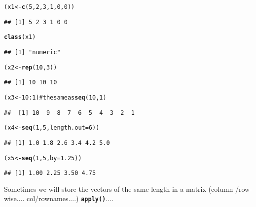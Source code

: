 \documentclass[11pt]{article}\usepackage{graphicx, color}
\makeatletter
\newcommand{\hlfunctioncall}[1]{\textcolor[rgb]{0.501960784313725,0,0.329411764705882}{\textbf{#1}}}%
\newcommand{\hlcomment}[1]{\textcolor[rgb]{0.180392156862745,0.6,0.341176470588235}{#1}}%
\newenvironment{kframe}{%
 \def\at@end@of@kframe{}%
 \ifinner\ifhmode%
  \def\at@end@of@kframe{\end{minipage}}%
  \begin{minipage}{\columnwidth}%
 \fi\fi%
 \def\FrameCommand##1{\hskip\@totalleftmargin \hskip-\fboxsep
 \colorbox{shadecolor}{##1}\hskip-\fboxsep
     \hskip-\linewidth \hskip-\@totalleftmargin \hskip\columnwidth}%
 \MakeFramed {\advance\hsize-\width
   \@totalleftmargin\z@ \linewidth\hsize
   \@setminipage}}%
 {\par\unskip\endMakeFramed%
 \at@end@of@kframe}
\newenvironment{knitrout}{}{} %
\newcommand{\Rfunc}[1]{\texttt{\hlfunctioncall{#1}}}
\theoremstyle{remark}
\theoremstyle{definition}
\makeatother
\begin{document}
\begin{knitrout}\small
{}\color{fgcolor}\begin{kframe}
\begin{alltt}
(x1 <- \hlfunctioncall{c}(5, 2, 3, 1, 0, 0))
\end{alltt}
\begin{verbatim}
## [1] 5 2 3 1 0 0
\end{verbatim}
\begin{alltt}
\hlfunctioncall{class}(x1)
\end{alltt}
\begin{verbatim}
## [1] "numeric"
\end{verbatim}
\begin{alltt}
(x2 <- \hlfunctioncall{rep}(10, 3))
\end{alltt}
\begin{verbatim}
## [1] 10 10 10
\end{verbatim}
\begin{alltt}
(x3 <- 10:1) \hlcomment{# the same as \hlfunctioncall{seq}(10, 1)}
\end{alltt}
\begin{verbatim}
##  [1] 10  9  8  7  6  5  4  3  2  1
\end{verbatim}
\begin{alltt}
(x4 <- \hlfunctioncall{seq}(1, 5, length.out=6))
\end{alltt}
\begin{verbatim}
## [1] 1.0 1.8 2.6 3.4 4.2 5.0
\end{verbatim}
\begin{alltt}
(x5 <- \hlfunctioncall{seq}(1, 5, by=1.25))
\end{alltt}
\begin{verbatim}
## [1] 1.00 2.25 3.50 4.75
\end{verbatim}
\end{kframe}
\end{knitrout}


Sometimes we will store the vectors of the same length
in a matrix (column-/row-wise.... col/rownames....) \Rfunc{apply()}....
\end{document}

